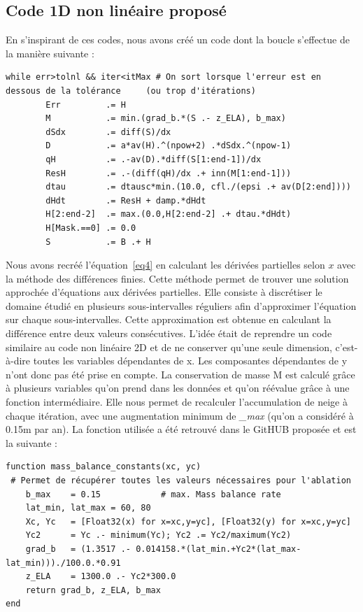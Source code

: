 \documentclass{article}
\begin{document}
\subsection{Code 1D non linéaire proposé}
En s'inspirant de ces codes, nous avons créé un code dont la boucle s'effectue de la manière suivante :
\newline
\begin{verbatim}
while err>tolnl && iter<itMax # On sort lorsque l'erreur est en 
dessous de la tolérance 	(ou trop d'itérations)
        Err         .= H                                               
        M           .= min.(grad_b.*(S .- z_ELA), b_max)            
        dSdx        .= diff(S)/dx 
        D           .= a*av(H).^(npow+2) .*dSdx.^(npow-1)              
        qH          .= .-av(D).*diff(S[1:end-1])/dx                     
        ResH        .= .-(diff(qH)/dx .+ inn(M[1:end-1])) 
        dtau        .= dtausc*min.(10.0, cfl./(epsi .+ av(D[2:end])))
        dHdt        .= ResH + damp.*dHdt                                
        H[2:end-2]  .= max.(0.0,H[2:end-2] .+ dtau.*dHdt)               
        H[Mask.==0] .= 0.0
        S           .= B .+ H                                       
\end{verbatim}
\newpage
Nous avons recréé l'équation~\eqref{eq4} en calculant les dérivées partielles selon ${x}$ avec la méthode des différences finies.
Cette méthode permet de trouver une solution approchée d'équations aux dérivées partielles. Elle consiste à discrétiser le domaine étudié en plusieurs sous-intervalles réguliers afin d'approximer l'équation sur chaque sous-intervalles. Cette approximation est obtenue en calculant la différence entre deux valeurs consécutives. 
L'idée était de reprendre un code similaire au code non linéaire 2D et de ne conserver qu'une seule dimension, c'est-à-dire toutes les variables dépendantes de x. Les composantes dépendantes de y n'ont donc pas été prise en compte.
\newline
La conservation de masse M est calculé grâce à plusieurs variables qu'on prend dans les données et qu'on réévalue grâce à une fonction intermédiaire. Elle nous permet de recalculer l'accumulation de neige à chaque itération, avec une augmentation minimum de \textit{\_max} (qu'on a considéré à 0.15m par an). La fonction utilisée a été retrouvé dans le GitHUB proposée et est la suivante :
\begin{verbatim}
function mass_balance_constants(xc, yc)
 # Permet de récupérer toutes les valeurs nécessaires pour l'ablation
    b_max    = 0.15            # max. Mass balance rate
    lat_min, lat_max = 60, 80
    Xc, Yc   = [Float32(x) for x=xc,y=yc], [Float32(y) for x=xc,y=yc]
    Yc2      = Yc .- minimum(Yc); Yc2 .= Yc2/maximum(Yc2)
    grad_b   = (1.3517 .- 0.014158.*(lat_min.+Yc2*(lat_max-lat_min)))./100.0.*0.91 
    z_ELA    = 1300.0 .- Yc2*300.0                              
    return grad_b, z_ELA, b_max
end                                   
\end{verbatim}
\end{document}
